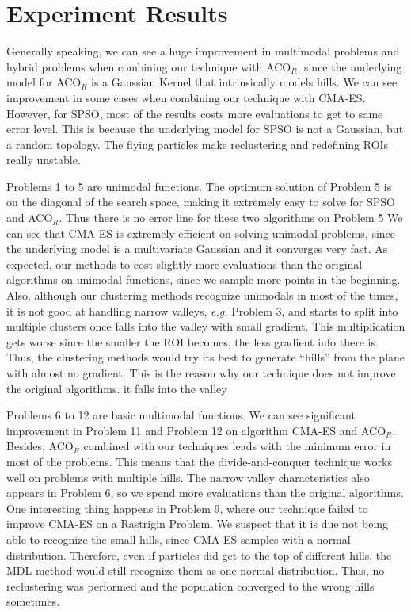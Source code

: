 
\section{Experiment Results}

Generally speaking, we can see a huge improvement in multimodal problems and hybrid problems
when combining our technique with ACO$_R$,
since the underlying model for ACO$_R$ is a Gaussian Kernel that intrinsically models hills.
We can see improvement in some cases when combining our technique with CMA-ES.
However, for SPSO, most of the results costs more evaluations to get to same error level.
This is because the underlying model for SPSO is not a Gaussian, but a random topology.
The flying particles make reclustering and redefining ROIs really unstable.


Problems 1 to 5 are unimodal functions.
The optimum solution of Problem 5 is on the diagonal of the search space, 
making it extremely easy to solve for SPSO and ACO$_R$.
Thus there is no error line for these two algorithms on Problem 5
We can see that CMA-ES is extremely efficient on solving unimodal problems, 
since the underlying model is a multivariate Gaussian and it converges very fast.
As expected, our methods to cost slightly more evaluations than the original algorithms on unimodal functions,
since we sample more points in the beginning. 
Also, although our clustering methods recognize unimodals in most of the times,
it is not good at handling narrow valleys, \textit{e.g.} Problem 3, 
and starts to split into multiple clusters once falls into the valley with small gradient.
This multiplication gets worse since the smaller the ROI becomes, the less gradient info there is.
Thus, the clustering methods would try its best to generate ``hills'' from the plane with almost no gradient.
This is the reason why our technique does not improve the original algorithms.
it falls into the valley


Problems 6 to 12 are basic multimodal functions.
We can see significant improvement in Problem 11 and Problem 12 on algorithm CMA-ES and ACO$_R$.
Besides, ACO$_R$ combined with our techniques leads with the minimum error in most of the problems.
This means that the divide-and-conquer technique works well on problems with multiple hills.
The narrow valley characteristics also appears in Problem 6, so we spend more evaluations than the original algorithms.
One interesting thing happens in Problem 9, where our technique failed to improve CMA-ES on a Rastrigin Problem.
We suspect that it is due not being able to recognize the small hills, since CMA-ES samples with a normal distribution.
Therefore, even if particles did get to the top of different hills, the MDL method would still recognize them as one normal distribution.
Thus, no reclustering was performed and the population converged to the wrong hills sometimes.

